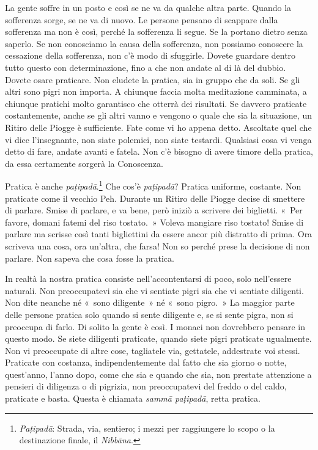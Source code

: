 La gente soffre in un posto e così se ne va da qualche altra parte.
Quando la sofferenza sorge, se ne va di nuovo. Le persone pensano di
scappare dalla sofferenza ma non è così, perché la sofferenza li segue.
Se la portano dietro senza saperlo. Se non conosciamo la causa della
sofferenza, non possiamo conoscere la cessazione della sofferenza, non
c'è modo di sfuggirle. Dovete guardare dentro tutto questo con
determinazione, fino a che non andate al di là del dubbio. Dovete osare
praticare. Non eludete la pratica, sia in gruppo che da soli. Se gli
altri sono pigri non importa. A chiunque faccia molta meditazione
camminata, a chiunque pratichi molto garantisco che otterrà dei
risultati. Se davvero praticate costantemente, anche se gli altri vanno
e vengono o quale che sia la situazione, un Ritiro delle Piogge è
sufficiente. Fate come vi ho appena detto. Ascoltate quel che vi dice
l'insegnante, non siate polemici, non siate testardi. Qualsiasi cosa vi
venga detto di fare, andate avanti e fatela. Non c'è bisogno di avere
timore della pratica, da essa certamente sorgerà la Conoscenza.

Pratica è anche \emph{paṭipadā}.\footnote{\emph{Paṭipadā}: Strada, via,
  sentiero; i mezzi per raggiungere lo scopo o la destinazione finale,
  il \emph{Nibbāna}.} Che cos'è \emph{paṭipadā}? Pratica uniforme,
costante. Non praticate come il vecchio Peh. Durante un Ritiro delle
Piogge decise di smettere di parlare. Smise di parlare, e va bene, però
iniziò a scrivere dei biglietti. «~Per favore, domani fatemi del riso
tostato.~» Voleva mangiare riso tostato! Smise di parlare ma scrisse
così tanti bigliettini da essere ancor più distratto di prima. Ora
scriveva una cosa, ora un'altra, che farsa! Non so perché prese la
decisione di non parlare. Non sapeva che cosa fosse la pratica.

In realtà la nostra pratica consiste nell'accontentarsi di poco, solo
nell'essere naturali. Non preoccupatevi sia che vi sentiate pigri sia
che vi sentiate diligenti. Non dite neanche né «~sono diligente~» né
«~sono pigro.~» La maggior parte delle persone pratica solo quando si
sente diligente e, se si sente pigra, non si preoccupa di farlo. Di
solito la gente è così. I monaci non dovrebbero pensare in questo modo.
Se siete diligenti praticate, quando siete pigri praticate ugualmente.
Non vi preoccupate di altre cose, tagliatele via, gettatele, addestrate
voi stessi. Praticate con costanza, indipendentemente dal fatto che sia
giorno o notte, quest'anno, l'anno dopo, come che sia e quando che sia,
non prestate attenzione a pensieri di diligenza o di pigrizia, non
preoccupatevi del freddo o del caldo, praticate e basta. Questa è
chiamata \emph{sammā paṭipadā}, retta pratica.

